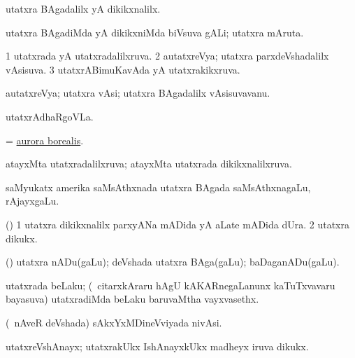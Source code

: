 \bentry
{}
\gl{\kirxvi}
\bmng
utatxra BAgadalilx yA dikikxnalilx. 
\emng
\eentry

\bentry
{}
\gl{\nA}
\bmng
utatxra BAgadiMda yA dikikxniMda biVsuva gALi; utatxra mAruta. 
\emng
\eentry

\bentry
{}
\gl{\gu}
\bmng
\bnum
\num{1} utatxrada yA utatxradalilxruva. 
\num{2} autatxreVya; utatxra parxdeVshadalilx vAsisuva. 
\num{3} utatxrABimuKavAda yA utatxrakikxruva. 
\enum
\emng
\eentry

\bentry
{}
\gl{\nA}
\bmng
autatxreVya; utatxra vAsi; utatxra BAgadalilx vAsisuvavanu. 
\emng
\eentry

\bentry
{}
\gl{\nA}
\bmng
utatxrAdhaRgoVLa. 
\emng
\eentry

\bentry
{}
\gl{\nA}
\bmng
= \hyperref{kandict_a.pdf}{A}{aurora borealis}{aurora borealis}. 
\emng
\eentry

\bentry
{}
\gl{\gu}
\bmng
atayxMta utatxradalilxruva; atayxMta utatxrada dikikxnalilxruva. 
\emng
\eentry

\bentry
{}
\gl{\nA}
\bmng
saMyukatx amerika saMsAthxnada utatxra BAgada saMsAthxnagaLu, rAjayxgaLu. 
\emng
\eentry

\bentry
{}
\gl{\nA}
\bmng
(\nw) 
\bnum
\num{1} utatxra dikikxnalilx parxyANa mADida yA aLate mADida dUra. 
\num{2} utatxra dikukx. 
\enum
\emng
\eentry

\bentry
{}
\gl{\nA}
\bmng
(\kAparx) utatxra nADu(gaLu); deVshada utatxra BAga(gaLu); baDaganADu(gaLu). 
\emng
\eentry

\bentry
{}
\gl{\nA}
\bmng
utatxrada beLaku; (\kanmu\ citarxkAraru hAgU kAKARnegaLanunx kaTuTxvavaru bayasuva) utatxradiMda beLaku baruvaMtha vayxvasethx. 
\emng
\eentry

\bentry
{}
\gl{\nA}
\bmng
(\kanmu\ nAveR deVshada) sAkxYxMDineVviyada nivAsi. 
\emng
\eentry

\bentry
{}
\gl{\nA}
\bmng
utatxreVshAnayx; utatxrakUkx IshAnayxkUkx madheyx iruva dikukx. 
\emng
\eentry

